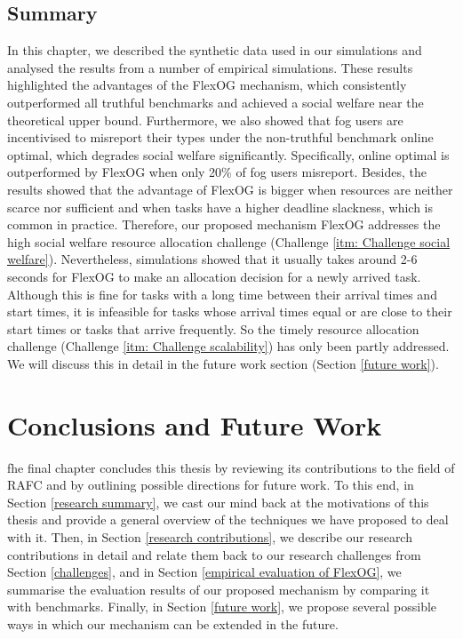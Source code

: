 \documentclass[11pt]{phdthesis}
\begin{document}
\section{Summary}
In this chapter, we described the synthetic data used in our simulations and analysed the results from a number of empirical simulations. These results highlighted the advantages of the FlexOG mechanism, which consistently outperformed all truthful benchmarks and achieved a social welfare near the theoretical upper bound. Furthermore, we also showed that fog users are incentivised to misreport their types under the non-truthful benchmark online optimal, which degrades social welfare significantly. Specifically, online optimal is outperformed by FlexOG when only 20\% of fog users misreport. Besides, the results showed that the advantage of FlexOG is bigger when resources are neither scarce nor sufficient and when tasks have a higher deadline slackness, which is common in practice. Therefore, our proposed mechanism FlexOG addresses the high social welfare resource allocation challenge (Challenge \ref{itm: Challenge social welfare}). Nevertheless, simulations showed that it usually takes around 2-6 seconds for FlexOG to make an allocation decision for a newly arrived task. Although this is fine for tasks with a long time between their arrival times and start times, it is infeasible for tasks whose arrival times equal or are close to their start times or tasks that arrive frequently. So the timely resource allocation challenge (Challenge \ref{itm: Challenge scalability}) has only been partly addressed. We will discuss this in detail in the future work section (Section \ref{future work}).

\chapter{Conclusions and Future Work} \label{conclusions and future work}

fhe final chapter concludes this thesis by reviewing its contributions to the field of RAFC and by outlining possible directions for future work. To this end, in Section \ref{research summary}, we cast our mind back at the motivations of this thesis and provide a general overview of the techniques we have proposed to deal with it. Then, in Section \ref{research contributions}, we describe our research contributions in detail and relate them back to our research challenges from Section \ref{challenges}, and in Section \ref{empirical evaluation of FlexOG}, we summarise the evaluation results of our proposed mechanism by comparing it with benchmarks. Finally, in Section \ref{future work}, we propose several possible ways in which our mechanism can be extended in the future.
\end{document}
